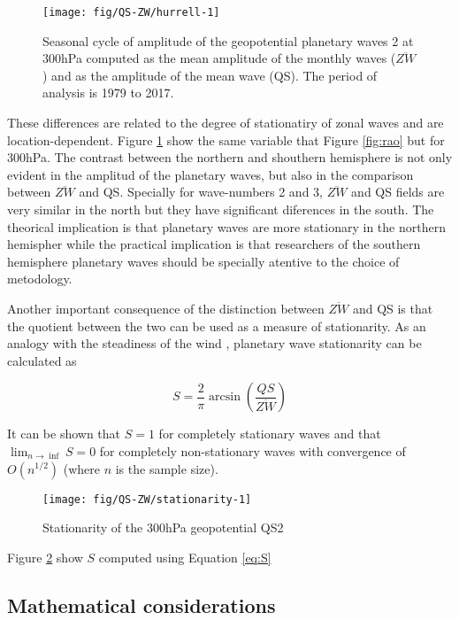 \documentclass[draft,linenumbers]{agujournal2018}
\begin{document}
\begin{figure}[h]
\texttt{[image: fig/QS-ZW/hurrell-1]} \caption{Seasonal cycle of amplitude of the geopotential planetary waves 2 at 300hPa computed as the mean amplitude of the monthly waves ($\overline{ZW}$) and as the amplitude of the mean wave (QS). The period of analysis is 1979 to 2017.}\label{fig:hurrell}
\end{figure}

These differences are related to the degree of stationatiry of zonal
waves and are location-dependent. Figure \ref{fig:hurrell} show the same
variable that Figure \ref{fig:rao} but for 300hPa. The contrast between
the northern and shouthern hemisphere is not only evident in the
amplitud of the planetary waves, but also in the comparison between
\(\overline{ZW}\) and QS. Specially for wave-numbers 2 and 3,
\(\overline{ZW}\) and QS fields are very similar in the north but they
have significant diferences in the south. The theorical implication is
that planetary waves are more stationary in the northern hemispher while
the practical implication is that researchers of the southern hemisphere
planetary waves should be specially atentive to the choice of
metodology.

Another important consequence of the distinction between
\(\overline{ZW}\) and QS is that the quotient between the two can be
used as a measure of stationarity. As an analogy with the steadiness of
the wind \citep{Singer1967}, planetary wave stationarity can be
calculated as

\begin{linenomath*}
\begin{equation}\label{eq:S}
S = \frac{2}{\pi}\arcsin{\left ( \frac{QS}{\overline{ZW}} \right )}
\end{equation}
\end{linenomath*}

It can be shown that \(S = 1\) for completely stationary waves and that
\(\lim_{n \rightarrow \inf} S = 0\) for completely non-stationary waves
with convergence of \(O\left (n^{1/2}\right)\) (where \(n\) is the
sample size).

\begin{figure}[h]
\texttt{[image: fig/QS-ZW/stationarity-1]} \caption{Stationarity of the 300hPa geopotential QS2 }\label{fig:stationarity}
\end{figure}

Figure \ref{fig:stationarity} show \(S\) computed using Equation
\ref{eq:S}

\subsection{Mathematical considerations}
\end{document}
